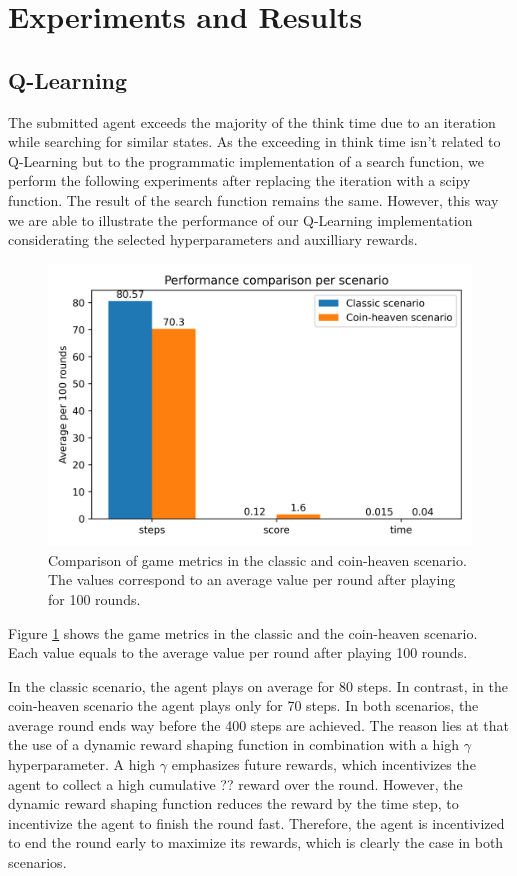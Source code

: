 \documentclass[
	letterpaper, %
	12pt, %
]{CSUniSchoolLabReport}
\begin{document}
\section{Experiments and Results}

\subsection{Q-Learning}
The submitted agent exceeds the majority of the think time due to an iteration while searching for
similar states.
As the exceeding in think time isn't related to Q-Learning but to the programmatic implementation of a search function,
we perform the following experiments after replacing the iteration with a scipy function.
The result of the search function remains the same.
However, this way we are able to illustrate the performance of our Q-Learning implementation
considerating the selected hyperparameters and auxilliary rewards.


\begin{figure}[h]
	\centering
	\includegraphics[scale=0.6]{Figures/metrics.png}
	\caption{Comparison of game metrics in the classic and coin-heaven scenario. The values
		correspond to an average value per round after playing for 100 rounds.}
	\label{img:metrics}
\end{figure}

Figure \ref{img:metrics} shows the game metrics in the classic and the coin-heaven
scenario. Each value equals to the average value per round after playing 100 rounds.

In the classic scenario, the agent plays on average for 80 steps. In contrast, in the
coin-heaven scenario the agent plays only for 70 steps. In both scenarios, the
average round ends way before the 400 steps are achieved. The reason lies at that
the use of a dynamic reward shaping function in combination with a high $\gamma$ hyperparameter.
A high $\gamma$ emphasizes future rewards, which incentivizes the agent to collect a high cumulative ?? reward
over the round. However, the dynamic reward shaping function reduces the reward by the time step,
to incentivize the agent to finish the round fast. Therefore, the agent is incentivized to end the
round early to maximize its rewards, which is clearly the case in both scenarios.
\end{document}
